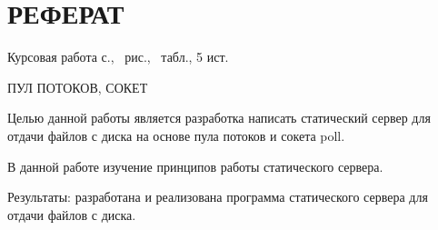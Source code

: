 \section*{\large РЕФЕРАТ}

Курсовая работа \pageref{LastPage} с., \totalfigures\ рис., \totaltables\ табл., 5 ист.

ПУЛ ПОТОКОВ, СОКЕТ

Целью данной работы является разработка написать статический сервер для отдачи файлов с диска на основе пула потоков и сокета poll.

В данной работе изучение принципов работы статического сервера.

Результаты: разработана и реализована программа статического сервера для отдачи файлов с диска.


\pagebreak